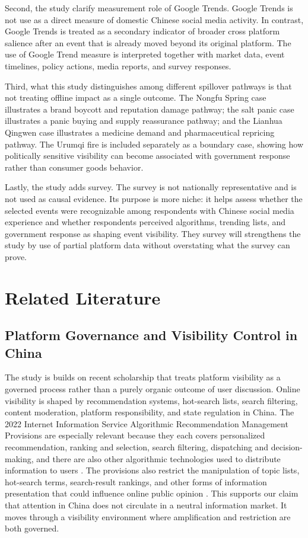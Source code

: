 \documentclass[conference]{IEEEtran}
\begin{document}
Second, the study clarify measurement role of Google Trends. Google Trends is not use as a direct measure of domestic Chinese social media activity. In contrast, Google Trends is treated as a secondary indicator of broader cross platform salience after an event that is already moved beyond its original platform. The use of Google Trend measure is interpreted together with market data, event timelines, policy actions, media reports, and survey responses.

Third, what this study distinguishes among different spillover pathways is that not treating offline impact as a single outcome. The Nongfu Spring case illustrates a brand boycott and reputation damage pathway; the salt panic case illustrates a panic buying and supply reassurance pathway; and the Lianhua Qingwen case illustrates a medicine demand and pharmaceutical repricing pathway. The Urumqi fire is included separately as a boundary case, showing how politically sensitive visibility can become associated with government response rather than consumer goods behavior.

Lastly, the study adds survey. The survey is not nationally representative and is not used as causal evidence. Its purpose is more niche: it helps assess whether the selected events were recognizable among respondents with Chinese social media experience and whether respondents perceived algorithms, trending lists, and government response as shaping event visibility. They survey will strengthens the study by use of partial platform data without overstating what the survey can prove.

\section{Related Literature}

\subsection{Platform Governance and Visibility Control in China}

The study is builds on recent scholarship that treats platform visibility as a governed process rather than a purely organic outcome of user discussion. Online visibility is shaped by recommendation systems, hot-search lists, search filtering, content moderation, platform responsibility, and state regulation in China. The 2022 Internet Information Service Algorithmic Recommendation Management Provisions are especially relevant because they each covers personalized recommendation, ranking and selection, search filtering, dispatching and decision-making, and there are also other algorithmic technologies used to distribute information to users \cite{digichina2022algorithmic}. The provisions also restrict the manipulation of topic lists, hot-search terms, search-result rankings, and other forms of information presentation that could influence online public opinion \cite{digichina2022algorithmic}. This supports our claim that attention in China does not circulate in a neutral information market. It moves through a visibility environment where amplification and restriction are both governed.
\end{document}
